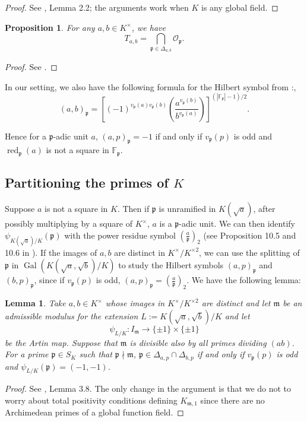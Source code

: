 \documentclass[12pt,reqno]{amsart}
\newcommand{\mm}{\mathfrak{m}}
\newcommand{\OO}{\mathcal{O}}
\newcommand{\FF}{\mathbb{F}}
\newcommand{\pp}{\mathfrak{p}}
\DeclareMathOperator{\red}{red}
\DeclareMathOperator{\Gal}{Gal}
\newtheorem{prop}[thm]{Proposition}
\newtheorem{lem}[thm]{Lemma}
\theoremstyle{definition}
\begin{document}
\begin{proof}
See \cite{Park}, Lemma 2.2; the arguments work when $K$ is any global field. 

\end{proof}

\begin{prop}
For any $a,b\in K^{\times}$, we have
\[
T_{a,b}=\bigcap_{\pp\in \Delta_{a,b}} \OO_{\pp}.
\]
\end{prop}

\begin{proof}
See \cite[Proposition 2.3]{Park}.
\end{proof}

In our setting, we also have the following formula for the Hilbert symbol from \cite[XIV.3.8]{Ser79}:,
\begin{equation}\label{hsymb}
  (a,b)_{\pp}= \left[(-1)^{v_{\pp}(a)v_{\pp}(b)}\left(\frac{a^{v_{\pp}(b)}}{b^{v_{\pp}(a)}}\right)\right]^{(|\FF_{\pp}|-1)/2}.
\end{equation}


Hence for a $\pp$-adic unit $a$, $(a,p)_{\pp}=-1$ if and only if
$v_{\pp}(p)$ is odd and $\red_{\pp}(a)$ is not a square in
$\FF_{\pp}$.


\subsection{Partitioning the primes of $K$}\label{integrality}
Suppose $a$ is not a square in $K$. Then if $\pp$ is unramified in
$K(\sqrt{a})$, after possibly multiplying by a square of $K^{\times}$, $a$ is a $\pp$-adic unit. We can then identify
$\psi_{K(\sqrt{a})/K}(\pp)$ with the power residue symbol
$\left(\frac{a}{\pp}\right)_2$ (see Proposition 10.5 and 10.6 in
\cite{Rosen02}).  If the images of $a,b$ are distinct in $K^{\times}/K^{\times2}$,
we can use the splitting of $\pp$ in $\Gal(K(\sqrt{a},\sqrt{b})/K)$ to
study the Hilbert symbols $(a,p)_{\pp}$ and $(b,p)_{\pp}$, since if
$v_{\pp}(p)$ is odd, $(a,p)_{\pp}=\left(\frac{a}{\pp}\right)_2$. We have the following lemma:

\begin{lem}\label{Park3.8}
  Take $a,b\in K^{\times}$ whose images in $K^{\times}/K^{\times2}$
  are distinct and let $\mm$ be an admissible modulus for the
  extension $L:=K(\sqrt{a},\sqrt{b})/K$ and let
\[
\psi_{L/K}: I_{\mm}\to\{\pm1\}\times \{\pm 1\}
\]
be the Artin map. Suppose that $\mm$ is
  divisible also by all primes dividing $(ab)$. For a prime
  $\pp\in S_K$ such that $\pp\nmid \mm$,
  $\pp\in \Delta_{a,p}\cap \Delta_{b,p}$ if and only if $v_{\pp}(p)$
  is odd and $\psi_{L/K}(\pp)=(-1,-1)$.
\end{lem}
\begin{proof}
  See \cite{Park}, Lemma 3.8. The only change in the argument is that
  we do not to worry about total positivity conditions defining
  $K_{\mm,1}$ since there are no Archimedean primes of a global
  function field.
\end{proof}
\end{document}
